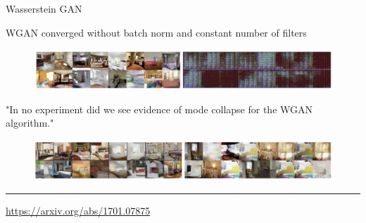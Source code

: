 \documentclass{beamer}
\begin{document}
\begin{frame}{Wasserstein GAN}
	\begin{block}{WGAN converged without batch norm and constant number of filters}
		\begin{figure}
			\centering
			\includegraphics[width=1.0\linewidth]{figs/wgan_convergence}
		\end{figure}
	\end{block}
	\begin{block}{"In no experiment did we see evidence of mode collapse for the WGAN algorithm."}
		\begin{figure}
			\centering
			\includegraphics[width=1.0\linewidth]{figs/wgan_mode_collapse}
		\end{figure}
	\end{block}
	\vfill
	\hrule\medskip 
	{\scriptsize \href{https://arxiv.org/abs/1701.07875}{https://arxiv.org/abs/1701.07875}}
\end{frame}
\end{document}
